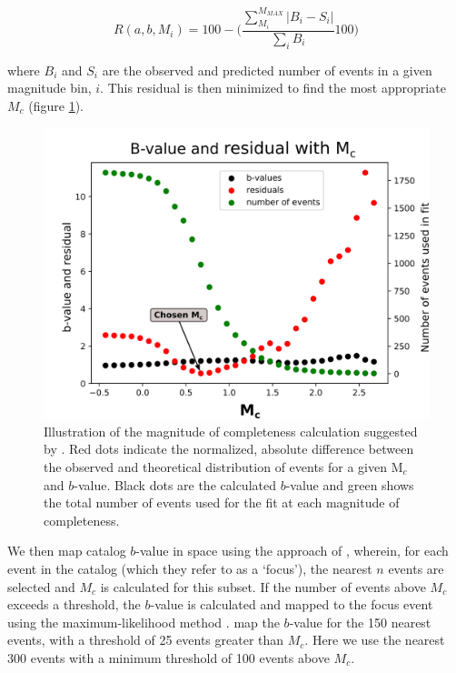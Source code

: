 \begin{equation}
    R(a, b, M_{i}) = 100 - \Bigg(\frac{\sum_{M_{i}}^{M_{MAX}}|B_{i} - S_{i}|}{\sum_{i}^{}B_{i}}100\Bigg)
\end{equation}

where $B_{i}$ and $S_{i}$ are the observed and predicted number of events in a given magnitude bin, $i$. This residual is then minimized to find the most appropriate $M_c$ (figure \ref{Mc_calc}).

\begin{figure}[h!]
\begin{center}
\includegraphics[width=1.00\columnwidth]{Chapter_4_Rot/figures/Mc_calc_wiemer_wyss_2000/Rot_IFF_wedge_wiemer_wyss_2000}
\caption[M$_{c}$ calculation]{{
Illustration of the magnitude of completeness calculation suggested by \citet{Wiemer_2000}. Red dots indicate the normalized, absolute difference between the observed and theoretical distribution of events for a given M$_{c}$ and $b$-value. Black dots are the calculated $b$-value and green shows the total number of events used for the fit at each magnitude of completeness.
{\label{Mc_calc}}%
}}
\end{center}
\end{figure}

We then map catalog $b$-value in space using the approach of \citet{Bachmann_2012}, wherein, for each event in the catalog (which they refer to as a `focus'), the nearest $n$ events are selected and $M_c$ is calculated for this subset. If the number of events above $M_c$ exceeds a threshold, the $b$-value is calculated and mapped to the focus event using the maximum-likelihood method \citep{aki1965maximum,shi1982standard}. \citet{Bachmann_2012} map the $b$-value for the 150 nearest events, with a threshold of 25 events greater than $M_c$. Here we use the nearest 300 events with a minimum threshold of 100 events above $M_c$.

